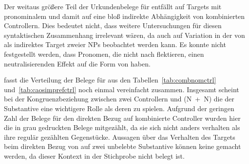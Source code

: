 Der weitaus größere Teil der Urkundenbelege für  entfällt auf
Targets mit pro\-nomi\-nalem  und damit auf eine bloß indirekte
Abhängigkeit von kombinierten Controllern. Dies bedeutet nicht, dass weitere
Untersuchungen für diesen syntaktischen Zusammenhang irrelevant wären, da auch
auf  Variation in der  von  als
indirektes Target zweier NPs beobachtet werden kann. Es konnte nicht
festgestellt werden, dass Pronomen, die nicht nach  flektieren,
einen neutralisierenden Effekt auf die Form von  haben.

 fasst die Verteilung der Belege für 
aus den Tabellen~\ref{tab:combnomctrl} und~\ref{tab:caosimprefctrl} noch einmal
vereinfacht zusammen. Insgesamt scheint bei der
Kongruenzbeziehung zwischen zwei
Controllern und  (N~+~N) die
 der Substantive eine wichtigere Rolle als deren
 zu spielen. Aufgrund der geringen Zahl der Belege für den direkten
Bezug auf kombinierte Controller wurden hier die in 
grau gedruckten Belege mitgezählt, da sie sich nicht anders verhalten als ihre
regulär gezählten Gegenstücke. Aussagen über das Verhalten des Targets beim
direkten Bezug von  auf zwei unbelebte Substantive
können keine gemacht werden, da dieser Kontext in der Stichprobe nicht
belegt ist.

